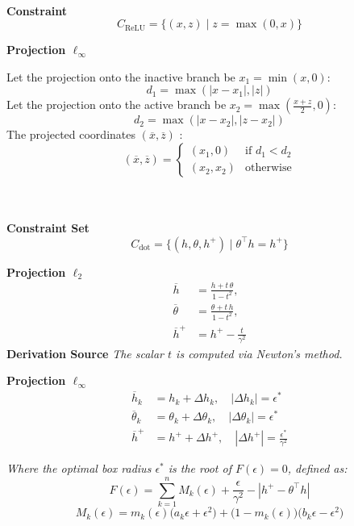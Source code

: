 \documentclass{article}
\begin{document}
\begin{tcolorbox}[projectioncard, title=ReLU Layer ($\ell_\infty$)]
\\
\textbf{Constraint}
\[
C_{\mathrm{ReLU}} = \{(x, z) \mid z = \max(0, x)\}
\]

\textbf{Projection $\ell_\infty$}


Let the projection onto the inactive branch be $x_1 = \min(x, 0)$:
\[
d_1 = \max(|x - x_1|, |z|)
\]
Let the projection onto the active branch be $x_2 = \max\left(\frac{x + z}{2}, 0\right)$:
\[
d_2 = \max(|x - x_2|, |z - x_2|)
\]
The projected coordinates $(\overline{x}, \overline{z})$ :
\[
(\overline{x}, \overline{z}) = 
\begin{cases} 
(x_1, 0) & \text{if } d_1 < d_2 \\ 
(x_2, x_2) & \text{otherwise} 
\end{cases}
\]
\end{tcolorbox}
\begin{tcolorbox}[projectioncard, title=Linear Layer]
\\
\\
\textbf{Constraint Set}
\[
C_{\mathrm{dot}} = \{(h, \theta, h^+) \mid \theta^\top h = h^+\}
\]

\textbf{Projection $\ell_2$}
\[
\begin{aligned}
\overline{h} &= \frac{h + t\,\theta}{1-t^2}, \\
\overline{\theta} &= \frac{\theta + t\,h}{1-t^2}, \\
\overline{h}^+ &= h^+ - \frac{t}{\gamma^2}
\end{aligned}
\]
\textbf{Derivation Source}
\cite{bauschke_bilinear, elser2019learning, bergmeister2025projection}
\textit{The scalar $t$ is computed via Newton's method.}
\vspace{1.0em}

\textbf{Projection $\ell_\infty$}
\[
\begin{aligned}
\overline{h}_k &= h_k + \Delta h_k, \quad |\Delta h_k| = \epsilon^* \\
\overline{\theta}_k &= \theta_k + \Delta \theta_k, \quad |\Delta \theta_k| = \epsilon^* \\
\overline{h}^+ &= h^+ + \Delta h^+, \quad |\Delta h^+| = \frac{\epsilon^*}{\gamma^2}
\end{aligned}
\]

\vspace{0.5em}
\textit{Where the optimal box radius $\epsilon^*$ is the root of $F(\epsilon) = 0$, defined as:}
\[
F(\epsilon) = \sum_{k=1}^{n} M_k(\epsilon) + \frac{\epsilon}{\gamma^2} - |h^{+} - \theta^\top h|
\]
\[
M_k(\epsilon) = m_k(\epsilon)\bigl(a_k\epsilon+\epsilon^2\bigr) + \bigl(1-m_k(\epsilon)\bigr)\bigl(b_k\epsilon-\epsilon^2\bigr)
\]
\end{tcolorbox}
\end{document}
